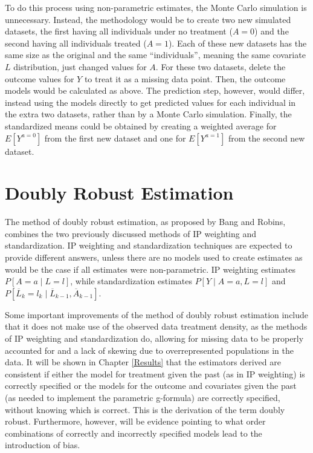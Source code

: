 To do this process using non-parametric estimates, the Monte Carlo simulation is unnecessary.  Instead, the methodology would be to create two new simulated datasets, the first having all individuals under no treatment ($A=0$) and the second having all individuals treated ($A=1$).  Each of these new datasets has the same size as the original and the same ``individuals'', meaning the same covariate $L$ distribution, just changed values for $A$.  For these two datasets, delete the outcome values for $Y$ to treat it as a missing data point.  Then, the outcome models would be calculated as above.  The prediction step, however, would differ, instead using the models directly to get predicted values for each individual in the extra two datasets, rather than by a Monte Carlo simulation.  Finally, the standardized means could be obtained by creating a weighted average for $E[Y^{a=0}]$ from the first new dataset and one for $E[Y^{a=1}]$ from the second new dataset.  

\section{Doubly Robust Estimation} 
The method of doubly robust estimation, as proposed by Bang and Robins,\cite{bang2005doubly} combines the two previously discussed methods of IP weighting and standardization.  IP weighting and standardization techniques are expected to provide different answers, unless there are no models used to create estimates as would be the case if all estimates were non-parametric.  \cite{hernan_robins_2016}   IP weighting estimates $P[A=a \mid L =l]$, while standardization estimates $P[Y \mid A = a, L=l]$ and $P[\overline{L}_k =l_k \mid \overline{L}_{k-1}, \overline{A}_{k-1}]$.  

Some important improvements of the method of doubly robust estimation include that it does not make use of the observed data treatment density, as the methods of IP weighting and standardization do, allowing for missing data to be properly accounted for and a lack of skewing due to overrepresented populations in the data.  It will be shown in Chapter \ref{Results} that the estimators derived are consistent if either the model for treatment given the past (as in IP weighting) is correctly specified or the models for the outcome and covariates given the past (as needed to implement the parametric g-formula) are correctly specified, without knowing which is correct.  This is the derivation of the term doubly robust.  Furthermore, however, will be evidence pointing to what order combinations of correctly and incorrectly specified models lead to the introduction of bias.  

